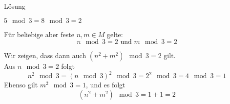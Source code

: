 \begin{frame}{Lösung}
	\begin{description}[<+->]
		\item[Induktionsanfang] $5 \mod 3 = 8 \mod 3 = 2$
		\item[Induktionsvoraussetzung]
Für beliebige aber feste $n, m \in M$ gelte: $$n \mod 3 = 2 \text{ und } m \mod 3 = 2$$
		\item[Induktionsschritt:] Wir zeigen, dass dann auch $(n^2 + m^2 ) \mod 3 = 2$ gilt. \pause \\
		Aus $n \mod 3 = 2$ folgt $$n^2 \mod 3 = (n \mod 3)^2 \mod 3 = 2^2 \mod 3 = 4 \mod 3 = 1$$ Ebenso gilt $m^2 \mod 3 = 1$, und es folgt $$(n^2 + m^2 ) \mod 3 = 1 + 1 = 2$$
	\end{description}
\end{frame}

